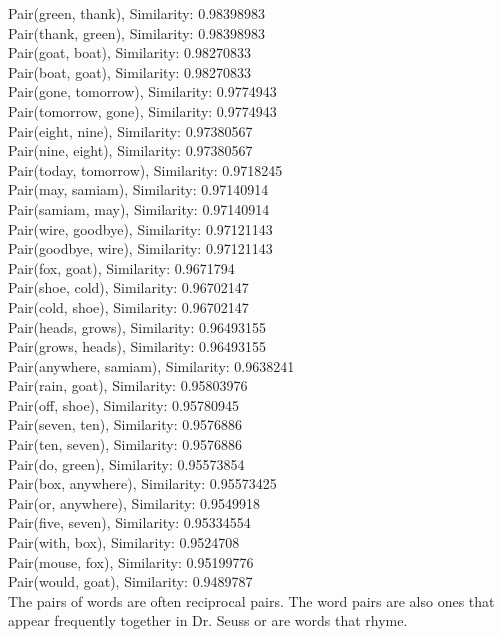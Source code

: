 \documentclass[12pt]{article} %
\begin{document}
Pair(green, thank), Similarity: 0.98398983  \\
Pair(thank, green), Similarity: 0.98398983  \\
Pair(goat, boat), Similarity: 0.98270833  \\
Pair(boat, goat), Similarity: 0.98270833  \\
Pair(gone, tomorrow), Similarity: 0.9774943  \\
Pair(tomorrow, gone), Similarity: 0.9774943  \\
Pair(eight, nine), Similarity: 0.97380567  \\
Pair(nine, eight), Similarity: 0.97380567  \\
Pair(today, tomorrow), Similarity: 0.9718245  \\
Pair(may, samiam), Similarity: 0.97140914  \\
Pair(samiam, may), Similarity: 0.97140914  \\
Pair(wire, goodbye), Similarity: 0.97121143  \\
Pair(goodbye, wire), Similarity: 0.97121143  \\
Pair(fox, goat), Similarity: 0.9671794  \\
Pair(shoe, cold), Similarity: 0.96702147  \\
Pair(cold, shoe), Similarity: 0.96702147  \\
Pair(heads, grows), Similarity: 0.96493155  \\
Pair(grows, heads), Similarity: 0.96493155  \\
Pair(anywhere, samiam), Similarity: 0.9638241  \\
Pair(rain, goat), Similarity: 0.95803976  \\
Pair(off, shoe), Similarity: 0.95780945  \\
Pair(seven, ten), Similarity: 0.9576886  \\
Pair(ten, seven), Similarity: 0.9576886  \\
Pair(do, green), Similarity: 0.95573854  \\
Pair(box, anywhere), Similarity: 0.95573425  \\
Pair(or, anywhere), Similarity: 0.9549918  \\
Pair(five, seven), Similarity: 0.95334554  \\
Pair(with, box), Similarity: 0.9524708  \\
Pair(mouse, fox), Similarity: 0.95199776  \\
Pair(would, goat), Similarity: 0.9489787  \\

The pairs of words are often reciprocal pairs. The word pairs are also ones that appear frequently together in Dr. Seuss or are words that rhyme.
\end{document}
